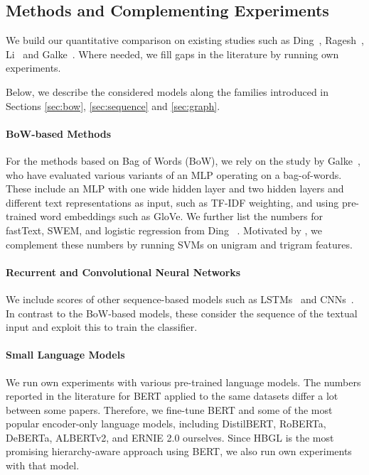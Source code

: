 \documentclass[acmsmall,nonacm]{acmart}
\begin{document}
\subsection{Methods and Complementing Experiments}

We build our quantitative comparison on existing studies such as Ding~\etal\cite{DBLP:conf/emnlp/DingWLLL20}, Ragesh~\etal\cite{DBLP:conf/wsdm/RageshSIBL21}, Li~\etal\cite{DBLP:journals/corr/abs-2405-11524} and Galke~\etal\cite{galkescherp-acl2022}.
Where needed, we fill gaps in the literature by running own experiments.

Below, we describe the considered models along the families introduced in Sections \ref{sec:bow}, \ref{sec:sequence} and \ref{sec:graph}.

\paragraph{BoW-based Methods}
For the methods based on Bag of Words (BoW), we rely on the study by Galke~\etal\cite{galkescherp-acl2022}, who have evaluated various variants of an MLP operating on a bag-of-words.
These include an MLP with one wide hidden layer
 and two hidden layers and different text representations as input, such as TF-IDF weighting, and using pre-trained word embeddings such as GloVe.
We further list the numbers for fastText, SWEM, and logistic regression from Ding \etal~\cite{DBLP:conf/emnlp/DingWLLL20}.
Motivated by \cite{DBLP:journals/corr/abs-2211-02563}, we complement these numbers by running SVMs on unigram and trigram features.

\paragraph{Recurrent and Convolutional Neural Networks} We include scores of other sequence-based models such as LSTMs~\cite{DBLP:conf/emnlp/DingWLLL20,zhao2021sequential} and CNNs~\cite{DBLP:conf/ijcnlp/ZhangW17,DBLP:conf/emnlp/Kim14}.
In contrast to the BoW-based models, these consider the sequence of the textual input and exploit this to train the classifier.

\paragraph{Small Language Models}
We run own experiments with various pre-trained language models.
The numbers reported in the literature for BERT applied to the same datasets differ a lot between some papers. 
Therefore, we fine-tune BERT and some of the most popular encoder-only language models, including DistilBERT, RoBERTa, DeBERTa,  ALBERTv2, and ERNIE 2.0 ourselves.
Since HBGL is the most promising hierarchy-aware approach using BERT, we also run own experiments with that model. 
\end{document}
